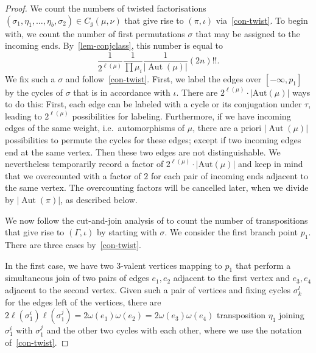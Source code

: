 \documentclass[11pt]{article}
\theoremstyle{definition}
\numberwithin{equation}{section}
\DeclareMathOperator{\Aut}{Aut}
\begin{document}
\begin{proof}
We count the numbers of twisted factorisations $(\sigma_1,\eta_1,\dots,\eta_b,\sigma_2)\in C_g(\mu,\nu)$ that give rise to $(\pi,\iota)$ via~\cref{con-twist}. To begin with, we count the number of first permutations $\sigma$ that may be assigned to the incoming ends. By~\cref{lem-conjclass}, this number is equal to
\begin{equation*}
    \frac{1}{2^{\ell(\mu)}} \frac{1}{\prod \mu_i} \frac{1}{|\Aut(\mu)|}(2n)!! .
\end{equation*}
We fix such a $\sigma$  and follow~\cref{con-twist}. First, we label the edges over $[-\infty,p_1]$ by the cycles of $\sigma$ that is in accordance with $\iota$. There are $2^{\ell(\mu)}\cdot |\mathrm{Aut}(\mu)|$ ways to do this: 
First, each edge can be labeled with a cycle or its conjugation under $\tau$, leading to $2^{\ell(\mu)}$ possibilities for labeling.
Furthermore, if we have incoming edges of the same weight, i.e.\ automorphisms of $\mu$, there are a priori $|\Aut(\mu)|$ possibilities to permute the cycles for these edges; except if two incoming edges end at the same vertex. Then these two edges are not distinguishable. We nevertheless temporarily record a factor of $2^{\ell(\mu)}\cdot |\mathrm{Aut}(\mu)|$ and keep in mind that we overcounted with a factor of $2$ for each pair  of incoming ends adjacent to the same vertex. The overcounting factors will be cancelled later, when we divide by $|\Aut(\pi)|$, as described below.

We now follow the cut-and-join analysis of \cite[Theorem 2.12]{BF21} to count the number of transpositions that give rise to $(\Gamma,\iota)$ by starting with $\sigma$. We consider the first branch point $p_1$. There are three cases by~\cref{con-twist}.

In the first case, we have two $3$-valent vertices mapping to $p_1$ that perform a simultaneous join of two pairs of edges $e_1,e_2$ adjacent to the first vertex and $e_3,e_4$ adjacent to the second vertex. Given such a pair of vertices and fixing cycles $\sigma_k^l$ for the edges left of the vertices, there are $2\ell(\sigma_1^i)\ell(\sigma_1^j)=2\omega(e_1)\omega(e_2)= 2\omega(e_3)\omega(e_4)$ transposition $\eta_1$ joining $\sigma_1^i$ with $\sigma_1^j$ and the other two cycles with each other, where we use the notation of~\cref{con-twist}.


\end{proof}
\end{document}
